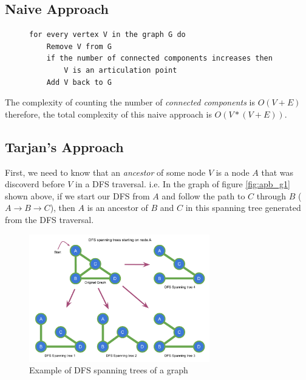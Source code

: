 \documentclass[twoside]{book}
\begin{document}
\subsection*{Naive Approach}

\begin{figure}[thp]
  \centering
  \begin{minipage}[c]{0.9\textwidth}
    \begin{verbatim}
for every vertex V in the graph G do
    Remove V from G
    if the number of connected components increases then
        V is an articulation point
    Add V back to G
      \end{verbatim}
  \end{minipage}
\end{figure}

The complexity of counting the number of \textit{connected components} is $O(V + E)$ therefore,
the total complexity of this naive approach is $O(V * (V + E))$.

\subsection*{Tarjan's Approach}

First, we need to know that an \textit{ancestor} of some node $V$ is a node $A$ that was discoverd
before $V$ in a DFS traversal. i.e. In the graph of figure \ref{fig:apb_g1} shown above, if we start
our DFS from $A$ and follow the path to $C$ through $B$ ($A \rightarrow B \rightarrow C$), then $A$
is an ancestor of $B$ and $C$ in this spanning tree generated from the DFS traversal.\\

\begin{figure}[H]
  \centering
  \includegraphics[width=0.7\textwidth]{"Images/Graph Theory/Articulation Points And Bridges/g2.pdf"}
  \caption{Example of DFS spanning trees of a graph}
  \label{fig:apb_g2}
\end{figure}
\end{document}
